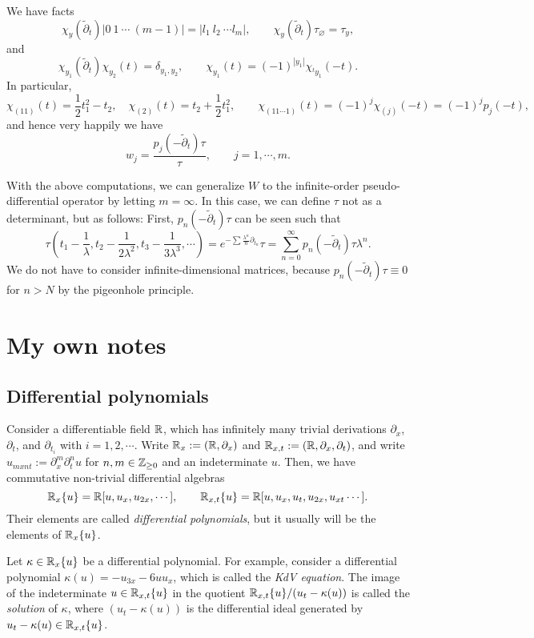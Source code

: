 \documentclass{../../../small}
\begin{document}
We have facts
\[\chi_y(\tilde\partial_t)|0\ 1\ \cdots\ (m-1)|=|l_1\ l_2\ \cdots l_m|,\qquad\chi_y(\tilde\partial_t)\tau_\varnothing=\tau_y,\]
and
\[\chi_{y_1}(\tilde\partial_t)\chi_{y_2}(t)=\delta_{y_1,y_2},\qquad\chi_{y_1}(t)=(-1)^{|y_1|}\chi_{^ty_1}(-t).\]
In particular,
\[\chi_{(11)}(t)=\frac12t_1^2-t_2,\quad\chi_{(2)}(t)=t_2+\frac12t_1^2,\qquad\chi_{(11\cdots1)}(t)=(-1)^j\chi_{(j)}(-t)=(-1)^jp_j(-t),\]
and hence very happily we have
\[w_j=\frac{p_j(-\tilde\partial_t)\tau}{\tau},\qquad j=1,\cdots,m.\]

With the above computations, we can generalize $W$ to the infinite-order pseudo-differential operator by letting $m=\infty$.
In this case, we can define $\tau$ not as a determinant, but as follows:
First, $p_n(-\tilde\partial_t)\tau$ can be seen such that
\[\tau(t_1-\frac1\lambda,t_2-\frac1{2\lambda^2},t_3-\frac1{3\lambda^3},\cdots)=e^{-\sum\frac{\lambda^n}n\partial_{t_n}}\tau=\sum_{n=0}^\infty p_n(-\tilde\partial_t)\tau\lambda^n.\]
We do not have to consider infinite-dimensional matrices, because $p_n(-\tilde\partial_t)\tau\equiv0$ for $n>N$ by the pigeonhole principle.







\newpage

\section*{My own notes}

\subsection*{Differential polynomials}

\begin{prb}
Consider a differentiable field $\mathbb{R}$, which has infinitely many trivial derivations $\partial_x$, $\partial_t$, and $\partial_{t_i}$ with $i=1,2,\cdots$.
Write $\mathbb{R}_x:=(\mathbb{R},\partial_x)$ and $\mathbb{R}_{x,t}:=(\mathbb{R},\partial_x,\partial_t)$, and write $u_{mxnt}:=\partial_x^m\partial_t^nu$ for $n,m\in\mathbb{Z}_{\ge0}$ and an indeterminate $u$.
Then, we have commutative non-trivial differential algebras
\[\mathbb{R}_x\{u\}=\mathbb{R}[u,u_x,u_{2x},\cdots],\qquad\mathbb{R}_{x,t}\{u\}=\mathbb{R}[u,u_x,u_t,u_{2x},u_{xt}\cdots].\]
Their elements are called \emph{differential polynomials}, but it usually will be the elements of $\mathbb{R}_x\{u\}$.

Let $\kappa\in\mathbb{R}_x\{u\}$ be a differential polynomial.
For example, consider a differential polynomial $\kappa(u)=-u_{3x}-6uu_x$, which is called the \emph{KdV equation}.
The image of the indeterminate $u\in\mathbb{R}_{x,t}\{u\}$ in the quotient $\mathbb{R}_{x,t}\{u\}/(u_t-\kappa(u))$ is called the \emph{solution} of $\kappa$, where $(u_t-\kappa(u))$ is the differential ideal generated by $u_t-\kappa(u)\in\mathbb{R}_{x,t}\{u\}$.
\end{prb}
\end{document}

